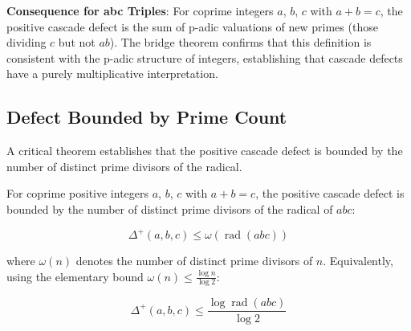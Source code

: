 \noindent \textbf{Consequence for abc Triples}: For coprime integers $a$, $b$, $c$ with $a + b = c$, the positive cascade defect is the sum of p-adic valuations of new primes (those dividing $c$ but not $ab$). The bridge theorem confirms that this definition is consistent with the p-adic structure of integers, establishing that cascade defects have a purely multiplicative interpretation.

\subsection{Defect Bounded by Prime Count}
\label{subsec:defect-bounded-by-prime-count}

A critical theorem establishes that the positive cascade defect is bounded by the number of distinct prime divisors of the radical.

\begin{theorem}
\label{thm:defect-bounded-by-prime-count}

For coprime positive integers $a$, $b$, $c$ with $a + b = c$, the positive cascade defect is bounded by the number of distinct prime divisors of the radical of $abc$:

\begin{equation}
\label{eq:defect-prime-count-bound}
\Delta^{+}(a,b,c) \leq \omega(\operatorname{rad}(abc))
\end{equation}

where $\omega(n)$ denotes the number of distinct prime divisors of $n$. Equivalently, using the elementary bound $\omega(n) \leq \frac{\log n}{\log 2}$:

\begin{equation}
\label{eq:defect-log-bound}
\Delta^{+}(a,b,c) \leq \frac{\log \operatorname{rad}(abc)}{\log 2}
\end{equation}

\end{theorem}

